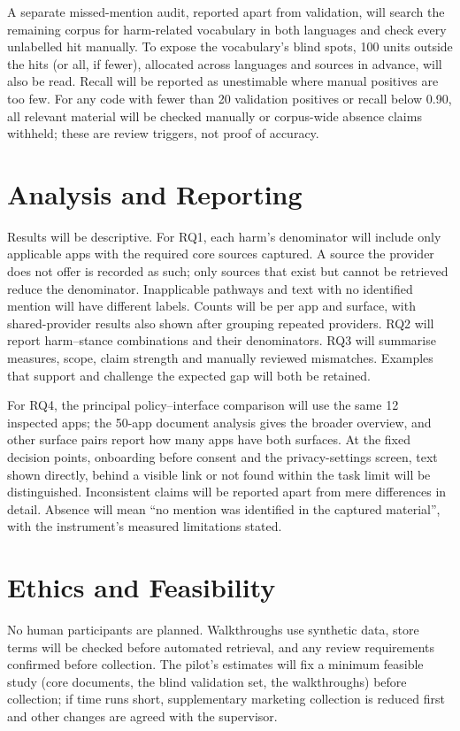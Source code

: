 A separate missed-mention audit, reported apart from validation, will search
the remaining corpus for harm-related vocabulary in both languages and check
every unlabelled hit manually. To expose the vocabulary's blind spots, 100
units outside the hits (or all, if fewer), allocated across languages and
sources in advance, will also be read. Recall will be reported as
unestimable where manual positives are too few. For any code with fewer than
20 validation positives or recall below 0.90, all relevant material will be
checked manually or corpus-wide absence claims withheld; these are review
triggers, not proof of accuracy.

\section{Analysis and Reporting} Results will be descriptive. For RQ1, each harm's denominator
will include only applicable apps with the required core sources captured. A
source the provider does not offer is recorded as such; only sources that
exist but cannot be retrieved reduce the denominator. Inapplicable pathways
and text with no identified mention will have different labels. Counts will be per app and surface, with
shared-provider results also shown after grouping repeated providers.
RQ2 will report harm--stance combinations and their denominators. RQ3 will
summarise measures, scope, claim strength and manually reviewed mismatches.
Examples that support and challenge the expected gap will both be retained.

For RQ4, the principal policy--interface comparison will use the same 12
inspected apps; the 50-app document analysis gives the broader overview, and
other surface pairs report how many apps have both surfaces. At the fixed
decision points, onboarding before consent and the privacy-settings screen,
text shown directly, behind a visible link or not found within the task limit
will be distinguished. Inconsistent claims will be reported apart from mere
differences in detail. Absence will mean \enquote{no mention was identified
in the captured material}, with the instrument's measured limitations stated.

\section{Ethics and Feasibility} No human participants are planned.
Walkthroughs use synthetic data, store terms will be checked before automated
retrieval, and any review requirements confirmed before collection. The
pilot's estimates will fix a minimum feasible study (core documents, the blind
validation set, the walkthroughs) before collection; if time runs short,
supplementary marketing collection is reduced first and other changes are
agreed with the supervisor.

